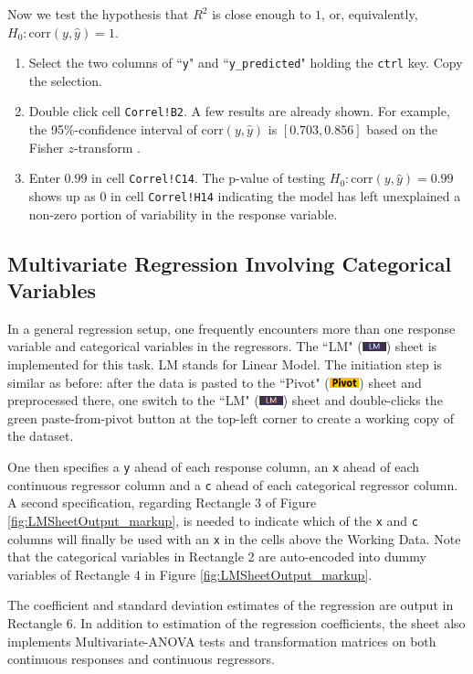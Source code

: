 \documentclass[article]{jss}
\numberwithin{equation}{subsection}
\newcommand{\shtPivot}{``Pivot" (\includegraphics[height=8pt, keepaspectratio=true]{PivotSheetTab_png}) }
\newcommand{\shtLM}{``LM" (\includegraphics[height=8pt, keepaspectratio=true]{LMSheetTab_png}) }
\begin{document}
        Now we test the hypothesis that $R^2$ is close enough to $1$, or, equivalently, $H_0: \textrm{corr} (y, \hat y) = 1$.
        \begin{enumerate}
          \item Select the two columns of ``\texttt{y}" and ``\texttt{y\_predicted}" holding the \texttt{ctrl} key. Copy the selection.
          \item Double click cell \texttt{Correl!B2}. 
          A few results are already shown. For example, the 95\%-confidence interval of $\textrm{corr} (y, \hat y)$ is $[0.703,0.856]$ based on the Fisher $z$-transform \citep{Fisherztransform1915}.
          \item Enter $0.99$ in  cell \texttt{Correl!C14}. The p-value of testing $H_0: \textrm{corr} (y, \hat y) = 0.99$ shows up as 0 in cell \texttt{Correl!H14} indicating the model has left unexplained a non-zero portion of variability in the response variable.
        \end{enumerate}
        
        \subsection[egLM]{Multivariate Regression Involving Categorical Variables}
        In a general regression setup, one frequently encounters more than one response variable and categorical variables in the regressors. The \shtLM sheet is implemented for this task. LM stands for Linear Model. The initiation step is similar as before: after the data is pasted to the \shtPivot sheet and preprocessed there, one switch to the \shtLM sheet and double-clicks the green paste-from-pivot button at the top-left corner to create a working copy of the dataset. 
        
        One then specifies a \texttt{y} ahead of each response column, an \texttt{x} ahead of each continuous regressor column and a \texttt{c} ahead of each categorical regressor column.        
        A second specification, regarding Rectangle 3 of Figure \ref{fig:LMSheetOutput_markup}, is needed to indicate which of the \texttt{x} and \texttt{c} columns will finally be used with an \texttt{x} in the cells above the Working Data. Note that the categorical variables in Rectangle 2 are auto-encoded into dummy variables of Rectangle 4 in Figure \ref{fig:LMSheetOutput_markup}. 
        
        The coefficient and standard deviation estimates of the regression are output in Rectangle 6. In addition to estimation of the regression coefficients, the sheet also implements Multivariate-ANOVA tests and transformation matrices on both continuous responses and continuous regressors.
        
\end{document}
